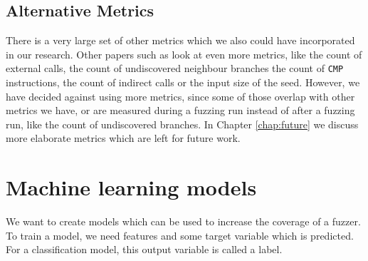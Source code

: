 

\subsection{Alternative Metrics}
There is a very large set of other metrics which we also could have incorporated in our research. Other papers such as \cite{chen2020meuzz} look at even more metrics, like the count of external calls, the count of undiscovered neighbour branches the count of  \texttt{CMP} instructions, the count of indirect calls or the input size of the seed. However, we have decided against using more metrics, since some of those overlap with other metrics we have, or are measured during a fuzzing run instead of after a fuzzing run, like the count of undiscovered branches. In Chapter \ref{chap:future} we discuss more elaborate metrics which are left for future work.




% 

\section{Machine learning models}\label{sec:MLmodels}
We want to create models which can be used to increase the coverage of a fuzzer. To train a model, we need features and some target variable which is predicted. For a classification model, this output variable is called a label.

